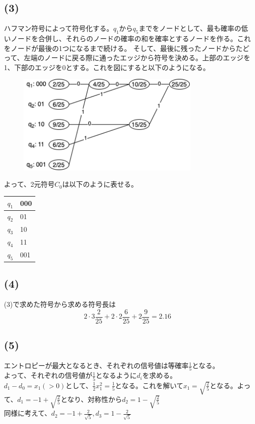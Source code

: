 \documentclass[a4paper,12pt,xelatex,ja=standard]{bxjsarticle}
\begin{document}
  \subsection*{(3)}
  ハフマン符号によって符号化する。$q_1$から$q_5$までをノードとして、最も確率の低いノードを合併し、それらのノードの確率の和を確率とするノードを作る。これをノードが最後の1つになるまで続ける。
  そして、最後に残ったノードからたどって、左端のノードに戻る際に通ったエッジから符号を決める。上部のエッジを1、下部のエッジを0とする。これを図にすると以下のようになる。
  \begin{figure}[H]
    \centering
    \includegraphics[width=9cm]{images/huffman_tree.png}
  \end{figure}
  よって、2元符号$C_0$は以下のように表せる。
  \begin{center}
    \begin{tabular}{ |l|l| }
    \hline
    \textit{$q_1$} & 000 \\ \hline
    \textbf{$q_2$} & 01  \\ \hline
    $q_3$          & 10  \\ \hline
    $q_4$          & 11  \\ \hline
    $q_5$          & 001 \\ \hline
    \end{tabular}
  \end{center}

  \subsection*{(4)}
  (3)で求めた符号から求める符号長は
  \[
    2 \cdot 3 \frac{2}{25} + 2 \cdot 2 \frac{6}{25} + 2 \frac{9}{25} = 2.16
  \]

  \subsection*{(5)}
  エントロピーが最大となるとき、それぞれの信号値は等確率$\frac{1}{5}$となる。\\
  よって、それぞれの信号値が$\frac{1}{5}$となるように$d_i$を求める。\\
  $d_1 - d_0 = x_1(>0)$として、$\frac{1}{2}x_1^2 = \frac{1}{5}$となる。これを解いて$x_1 = \sqrt{\frac{2}{5}}$となる。よって、$d_1 = -1 + \sqrt{\frac{2}{5}}$となり、対称性から$d_2 = 1 - \sqrt{\frac{2}{5}}$\\
  同様に考えて、$d_2 = -1 + \frac{2}{\sqrt{5}}, d_3 = 1 - \frac{2}{\sqrt{5}}$
\end{document}
